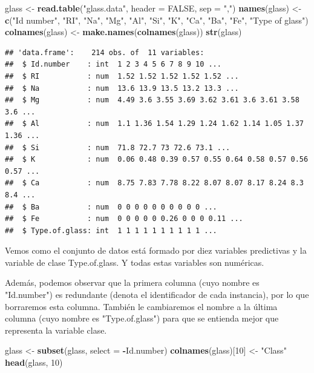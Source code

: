 \documentclass[]{article}
\newenvironment{Shaded}{\begin{snugshade}}{\end{snugshade}}
\newcommand{\DataTypeTok}[1]{\textcolor[rgb]{0.13,0.29,0.53}{#1}}
\newcommand{\DecValTok}[1]{\textcolor[rgb]{0.00,0.00,0.81}{#1}}
\newcommand{\KeywordTok}[1]{\textcolor[rgb]{0.13,0.29,0.53}{\textbf{#1}}}
\newcommand{\NormalTok}[1]{#1}
\newcommand{\OperatorTok}[1]{\textcolor[rgb]{0.81,0.36,0.00}{\textbf{#1}}}
\newcommand{\OtherTok}[1]{\textcolor[rgb]{0.56,0.35,0.01}{#1}}
\newcommand{\StringTok}[1]{\textcolor[rgb]{0.31,0.60,0.02}{#1}}
\begin{document}
\begin{Shaded}
\begin{Highlighting}[]
\NormalTok{glass <-}\StringTok{ }\KeywordTok{read.table}\NormalTok{(}\StringTok{"glass.data"}\NormalTok{, }\DataTypeTok{header =} \OtherTok{FALSE}\NormalTok{, }\DataTypeTok{sep =} \StringTok{","}\NormalTok{)}
\KeywordTok{names}\NormalTok{(glass) <-}\StringTok{ }\KeywordTok{c}\NormalTok{(}\StringTok{"Id number"}\NormalTok{, }\StringTok{"RI"}\NormalTok{, }\StringTok{"Na"}\NormalTok{, }\StringTok{"Mg"}\NormalTok{, }\StringTok{"Al"}\NormalTok{, }\StringTok{"Si"}\NormalTok{, }\StringTok{"K"}\NormalTok{, }\StringTok{"Ca"}\NormalTok{, }\StringTok{"Ba"}\NormalTok{, }\StringTok{"Fe"}\NormalTok{, }
		\StringTok{"Type of glass"}\NormalTok{)}
\KeywordTok{colnames}\NormalTok{(glass) <-}\StringTok{ }\KeywordTok{make.names}\NormalTok{(}\KeywordTok{colnames}\NormalTok{(glass))}
\KeywordTok{str}\NormalTok{(glass)}
\end{Highlighting}
\end{Shaded}

\newpage

\begin{verbatim}
## 'data.frame':    214 obs. of  11 variables:
##  $ Id.number    : int  1 2 3 4 5 6 7 8 9 10 ...
##  $ RI           : num  1.52 1.52 1.52 1.52 1.52 ...
##  $ Na           : num  13.6 13.9 13.5 13.2 13.3 ...
##  $ Mg           : num  4.49 3.6 3.55 3.69 3.62 3.61 3.6 3.61 3.58 3.6 ...
##  $ Al           : num  1.1 1.36 1.54 1.29 1.24 1.62 1.14 1.05 1.37 1.36 ...
##  $ Si           : num  71.8 72.7 73 72.6 73.1 ...
##  $ K            : num  0.06 0.48 0.39 0.57 0.55 0.64 0.58 0.57 0.56 0.57 ...
##  $ Ca           : num  8.75 7.83 7.78 8.22 8.07 8.07 8.17 8.24 8.3 8.4 ...
##  $ Ba           : num  0 0 0 0 0 0 0 0 0 0 ...
##  $ Fe           : num  0 0 0 0 0 0.26 0 0 0 0.11 ...
##  $ Type.of.glass: int  1 1 1 1 1 1 1 1 1 1 ...
\end{verbatim}

Vemos como el conjunto de datos está formado por diez variables predictivas y la variable de clase Type.of.glass. Y todas estas variables son numéricas.

Además, podemos observar que la primera columna (cuyo nombre es "Id.number") es redundante (denota el identificador de cada
instancia), por lo que borraremos esta columna. También le cambiaremos el nombre a la última columna (cuyo nombre es "Type.of.glass") para que se entienda mejor que representa la variable clase.

\begin{Shaded}
\begin{Highlighting}[]
\NormalTok{glass <-}\StringTok{ }\KeywordTok{subset}\NormalTok{(glass, }\DataTypeTok{select =} \OperatorTok{-}\NormalTok{Id.number)}
\KeywordTok{colnames}\NormalTok{(glass)[}\DecValTok{10}\NormalTok{] <-}\StringTok{ "Class"}
\KeywordTok{head}\NormalTok{(glass, }\DecValTok{10}\NormalTok{)}
\end{Highlighting}
\end{Shaded}
\end{document}
